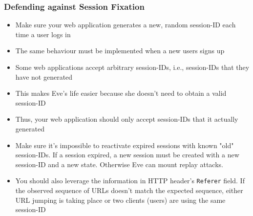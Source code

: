 \begin{frame}
    \frametitle{Defending against Session Fixation}
    \begin{itemize}
        \item Make sure your web application generates a new, random session-ID each time a user logs in
        \item The same behaviour must be implemented when a new users signs up
        \item Some web applications accept arbitrary session-IDs, i.e., session-IDs that they have not generated
        \item This makes Eve's life easier because she doesn't need to obtain a valid session-ID
        \item Thus, your web application should only accept session-IDs that it actually generated 
        \item Make sure it's impossible to reactivate expired sessions with known "old" session-IDs. If a session expired, a new session must be created with a new session-ID and a new state. Otherwise Eve can mount replay attacks.
        \item You should also leverage the information in HTTP header's \texttt{Referer} field. If the observed sequence of URLs doesn't match the expected sequence, either URL jumping is taking place or two clients (users) are using the same session-ID
    \end{itemize}
\end{frame}